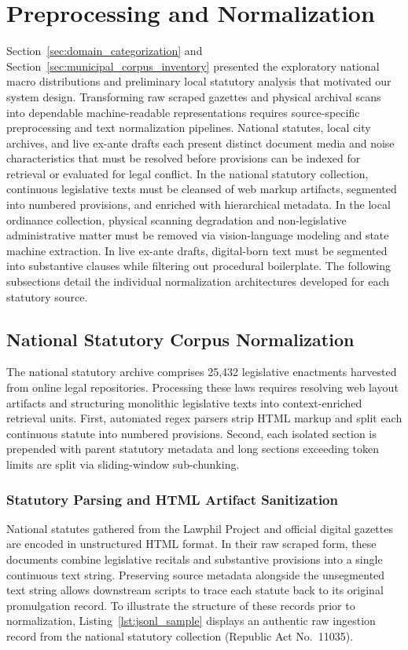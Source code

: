 \section{Preprocessing and Normalization}
\label{sec:preprocessing_filtering}
Section~\ref{sec:domain_categorization} and Section~\ref{sec:municipal_corpus_inventory} presented the exploratory national macro distributions and preliminary local statutory analysis that motivated our system design. Transforming raw scraped gazettes and physical archival scans into dependable machine-readable representations requires source-specific preprocessing and text normalization pipelines. National statutes, local city archives, and live ex-ante drafts each present distinct document media and noise characteristics that must be resolved before provisions can be indexed for retrieval or evaluated for legal conflict. In the national statutory collection, continuous legislative texts must be cleansed of web markup artifacts, segmented into numbered provisions, and enriched with hierarchical metadata. In the local ordinance collection, physical scanning degradation and non-legislative administrative matter must be removed via vision-language modeling and state machine extraction. In live ex-ante drafts, digital-born text must be segmented into substantive clauses while filtering out procedural boilerplate. The following subsections detail the individual normalization architectures developed for each statutory source.

    \subsection{National Statutory Corpus Normalization}
    \label{sec:national_preprocessing}
    \label{sec:boilerplate_and_metadata}
    The national statutory archive comprises 25,432 legislative enactments harvested from online legal repositories. Processing these laws requires resolving web layout artifacts and structuring monolithic legislative texts into context-enriched retrieval units. First, automated regex parsers strip HTML markup and split each continuous statute into numbered provisions. Second, each isolated section is prepended with parent statutory metadata and long sections exceeding token limits are split via sliding-window sub-chunking.

        \subsubsection{Statutory Parsing and HTML Artifact Sanitization}
        \label{sec:national_parsing_sanitization}
        National statutes gathered from the Lawphil Project and official digital gazettes are encoded in unstructured HTML format. In their raw scraped form, these documents combine legislative recitals and substantive provisions into a single continuous text string. Preserving source metadata alongside the unsegmented text string allows downstream scripts to trace each statute back to its original promulgation record. To illustrate the structure of these records prior to normalization, Listing~\ref{lst:jsonl_sample} displays an authentic raw ingestion record from the national statutory collection (Republic Act No.~11035).

